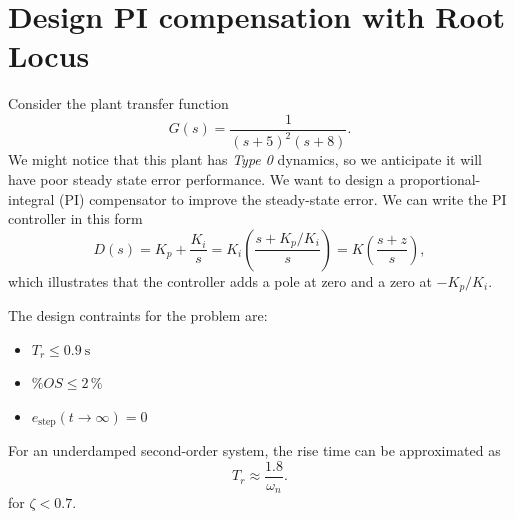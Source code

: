 \documentclass[11pt]{article}
\begin{document}
\section{Design PI compensation with Root Locus}

Consider the plant transfer function
\[
G(s) = \frac{1}{(s+5)^2 (s+8)}.
\]
We might notice that this plant has \emph{Type 0} dynamics, so we anticipate it will have poor steady state error performance.
We want to design a proportional-integral (PI) compensator to improve the steady-state error.  We can write the PI controller in this form
\[
D(s) = K_p + \frac{K_i}{s} = K_i \left(\frac{s + K_p/K_i}{s}\right) = K \left(\frac{s+z}{s}\right),
\]
which illustrates that the controller adds a pole at zero and a zero at $-K_p/K_i$.

The design contraints for the problem are:
\begin{itemize}
\item $T_r \leq 0.9 \: \text{s}$
\item $\%OS \leq 2 \, \%$
\item $e_{\text{step}}(t \rightarrow \infty) = 0$
\end {itemize}


For an underdamped second-order system, the rise time can be approximated as
\[ T_r \approx \frac{1.8}{\omega_n}.
\]
for $\zeta < 0.7$.
\end{document}
